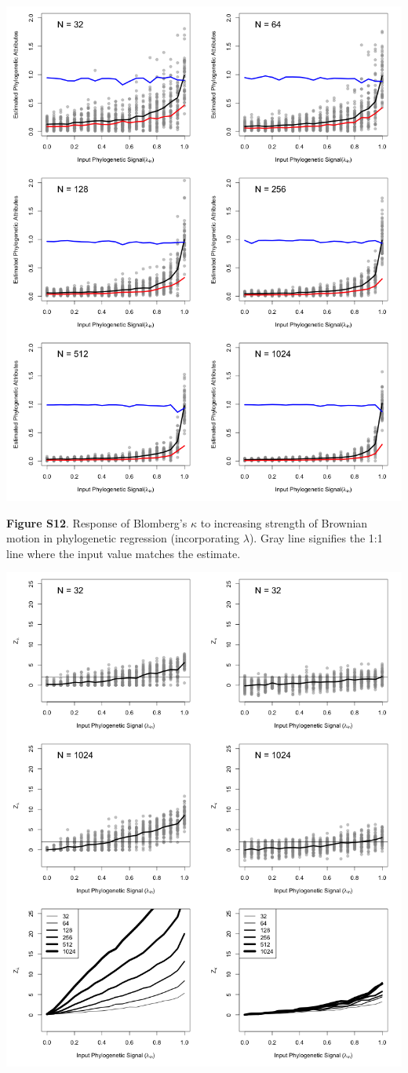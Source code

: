 \documentclass[
]{article}
\begin{document}
\includegraphics[width=0.95\linewidth]{fig.S12}

\textbf{Figure S12}. Response of Blomberg's \(\kappa\) to increasing
strength of Brownian motion in phylogenetic regression (incorporating
\(\lambda\)). Gray line signifies the 1:1 line where the input value
matches the estimate.

\includegraphics[width=0.95\linewidth]{fig.S13}
\end{document}
